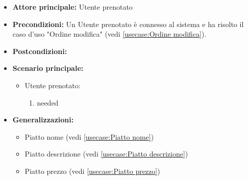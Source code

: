 \label{usecase:Ordine piatto lista}
\begin{itemize}
\item \textbf{Attore principale:} Utente prenotato
\item \textbf{Precondizioni:}
Un Utente prenotato è connesso al sistema e ha risolto il caso d'uso "Ordine modifica" (vedi \autoref{usecase:Ordine modifica}).
\item \textbf{Postcondizioni:}
\item \textbf{Scenario principale:}
\begin{itemize}
\item Utente prenotato:
\begin{enumerate}
\item needed
\end{enumerate}
\end{itemize}
\item \textbf{Generalizzazioni:}
\begin{itemize}
\item Piatto nome (vedi \autoref{usecase:Piatto nome})\item Piatto descrizione (vedi \autoref{usecase:Piatto descrizione})\item Piatto prezzo (vedi \autoref{usecase:Piatto prezzo})
\end{itemize}
\end{itemize}